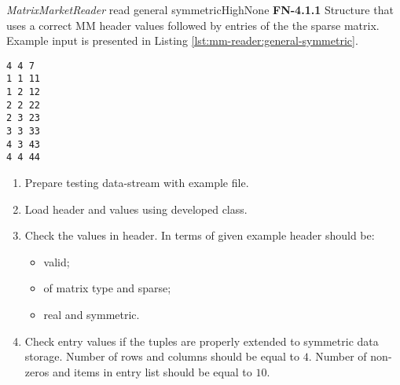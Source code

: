 \begin{testcase}{\emph{MatrixMarketReader} read general symmetric}{High}{None}
		{
			\textbf{FN-4.1.1}
		}
		{
			Structure that uses a correct \gls{MM} header values followed by entries of the the sparse matrix. Example input is presented in Listing \ref{lst:mm-reader:general-symmetric}. 	
		}
		\begin{lstlisting}[label={lst:mm-reader:general-symmetric},
			    basicstyle=\small,caption={\gls{MM} format data example}, frame=single]
%%MatrixMarket matrix coordinate real symmetric
4 4 7
1 1 11
1 2 12
2 2 22
2 3 23
3 3 33
4 3 43
4 4 44
		\end{lstlisting}
		{
			\begin{enumerate}
				\item Prepare testing data-stream with example file.
				\item Load header and values using developed class.
				\item
				{
					Check the values in header. In terms of given example header should be:
					\begin{itemize}
						\item valid;
						\item of matrix type and sparse;
						\item real and symmetric.
					\end{itemize}
				}
				\item
				{
					Check entry values if the tuples are properly extended to symmetric data storage.
					Number of rows and columns should be equal to $4$. Number of non-zeros and items in entry list should be equal to $10$.
				}
			\end{enumerate}
		}
	\end{testcase}

